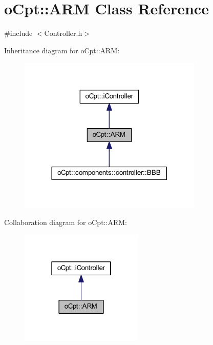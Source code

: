 \hypertarget{classo_cpt_1_1_a_r_m}{}\section{o\+Cpt\+:\+:A\+RM Class Reference}
\label{classo_cpt_1_1_a_r_m}


{\ttfamily \#include $<$Controller.\+h$>$}



Inheritance diagram for o\+Cpt\+:\+:A\+RM\+:
\nopagebreak
\begin{figure}[H]
\begin{center}
\leavevmode
\includegraphics[width=248pt]{classo_cpt_1_1_a_r_m__inherit__graph}
\end{center}
\end{figure}


Collaboration diagram for o\+Cpt\+:\+:A\+RM\+:
\nopagebreak
\begin{figure}[H]
\begin{center}
\leavevmode
\includegraphics[width=166pt]{classo_cpt_1_1_a_r_m__coll__graph}
\end{center}
\end{figure}
